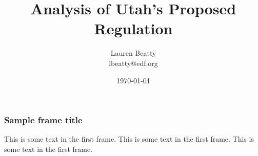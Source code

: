 \documentclass{beamer}
\title{Analysis of Utah's Proposed Regulation}
\author{Lauren Beatty\\ lbeatty@edf.org}
\institute{Environmental Defense Fund}
\date{\today}
\begin{document}
\frame{\titlepage}

\begin{frame}
\frametitle{Sample frame title}
This is some text in the first frame. This is some text in the first frame. This is some text in the first frame.
\end{frame}
\end{document}
